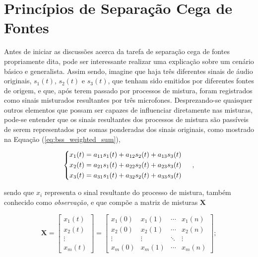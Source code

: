 \chapter{Princípios de Separação Cega de Fontes}
\label{cha:bss}

Antes de iniciar as discussões acerca da tarefa de separação cega de fontes propriamente dita, pode ser interessante realizar uma explicação sobre um cenário básico e generalista. Assim sendo, imagine que haja três diferentes sinais de áudio originais, $s_{1}(t)$, $s_{2}(t)$ e $s_{3}(t)$, que tenham sido emitidos por diferentes fontes de origem, e que, após terem passado por processos de mistura, foram registrados como sinais misturados resultantes por três microfones. Desprezando-se quaisquer outros elementos que possam ser capazes de influenciar diretamente nas misturas, pode-se entender que os sinais resultantes dos processos de mistura são passíveis de serem representados por somas ponderadas dos sinais originais, como mostrado na Equação (\ref{eq:bss_weighted_sum}),

\begin{equation}
\begin{cases}
\begin{aligned}
    x_{1}(t) = a_{11} s_{1}(t) +  a_{12} s_{2}(t) +  a_{13} s_{3}(t) \\
    x_{2}(t) = a_{21} s_{1}(t) +  a_{22} s_{2}(t) +  a_{23} s_{3}(t) \\
    x_{3}(t) = a_{31} s_{1}(t) +  a_{32} s_{2}(t) +  a_{33} s_{3}(t)
    \label{eq:bss_weighted_sum}
\end{aligned}
\end{cases}
\hspace{0.1cm},
\vspace{0.2cm}
\end{equation}

\noindent sendo que $x_{i}$ representa o sinal resultante do processo de mistura, também conhecido como \textit{observação}, e que compõe a matriz de misturas $\mathbf{X}$

\begin{equation}
    \mathbf{\mathbf{X}} =
        \left[
            \begin{array}{c}
                x_{1}(t)    \\
                x_{2}(t)    \\
                \vdots      \\
                x_{m}(t)    
            \end{array}
        \right]
        =
        \left[
            \begin{array}{cccc}
                x_{1}(0) & x_{1}(1) & \cdots & x_{1}(n) \\
                x_{2}(0) & x_{2}(1) & \cdots & x_{2}(n) \\
                \vdots & \vdots & \ddots & \vdots \\
                x_{m}(0) & x_{m}(1) & \cdots & x_{m}(n)
            \end{array} 
        \right];
    \label{eq:bss_mixture_matrix}
\end{equation}

